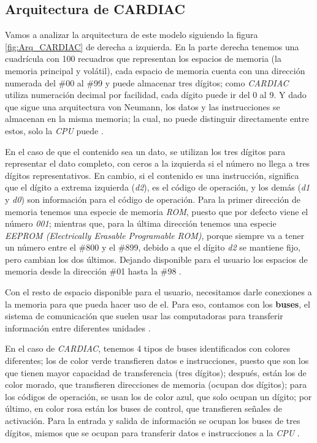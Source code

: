 \documentclass[letterpaper,12pt,oneside]{book}
\begin{document}
	\subsection{Arquitectura de CARDIAC}	
	
	Vamos a analizar la arquitectura de este modelo siguiendo la 
	figura \ref{fig:Arq_CARDIAC} de derecha a izquierda. En la parte
	derecha tenemos una cuadrícula con 100 recuadros que representan 
	los espacios de memoria (la memoria principal y volátil),
	cada espacio de memoria cuenta con una dirección numerada del \#00 al \#99 
	y puede almacenar tres dígitos; como \textit{CARDIAC} utiliza
	numeración decimal por facilidad, cada dígito puede ir del 0 al 9. Y dado que sigue una arquitectura
	 von Neumann, los datos
	y las instrucciones se almacenan en la misma memoria; 
	la cual, no puede distinguir directamente entre estos,  solo 
	la \textit{CPU} puede \cite{fingerman_instruction_1968}.
	
	En el caso de que el contenido sea un dato, se utilizan los tres dígitos 
	para representar el dato completo, con ceros a la 	
	izquierda si el número no llega a tres dígitos representativos. En cambio,
	si el contenido es una instrucción, significa que el dígito a extrema 
	izquierda (\textit{d2}),
	es el código de operación, y los demás (\textit{d1} y \textit{d0}) 
	son información para el código de operación. Para la primer dirección de memoria 
	tenemos una especie de memoria \textit{ROM}, puesto
	que por defecto viene el número \textit{001}; mientras que, para la última dirección
	tenemos una especie \textit{EEPROM (Electrically Erasable Programable ROM)}, porque
	siempre va a tener un número entre el \#800 y el \#899, debido a que el dígito \textit{d2}
	se mantiene fijo, pero cambian los dos últimos. Dejando disponible
	 para el usuario los espacios de memoria desde la dirección
	 \#01 hasta la \#98 \cite{fingerman_instruction_1968}.
	
	Con el resto de espacio disponible para el usuario, necesitamos
	darle conexiones a la memoria para
	que pueda hacer uso de el. Para eso, contamos con los \textbf{buses},
	el sistema de comunicación que suelen
	usar las computadoras para transferir información entre diferentes unidades 
	\cite{fingerman_instruction_1968}.
 
    En el caso de \textit{CARDIAC}, tenemos 4 tipos de buses
	identificados con colores diferentes; los de color verde transfieren datos e instrucciones, 
	puesto que son los que tienen mayor
	capacidad de transferencia (tres dígitos); después, están los de color morado, que transfieren
	direcciones de memoria (ocupan dos dígitos);
	para los códigos de operación, se usan los de color azul, que solo ocupan un dígito;
	por último, en color rosa están los buses de control,
	que transfieren señales de activación. Para la entrada y salida de información
	se ocupan los buses de tres dígitos, mismos que
	se ocupan para transferir datos e instrucciones a la \textit{CPU} \cite{fingerman_instruction_1968}.
	
\end{document}
